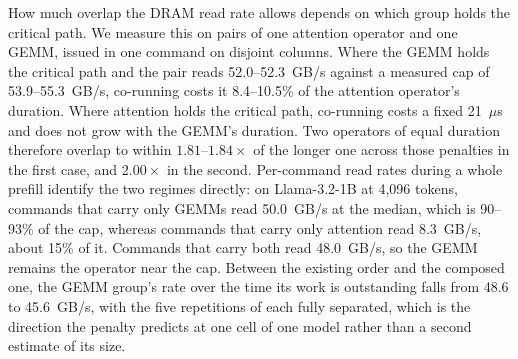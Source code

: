 How much overlap the DRAM read rate allows depends on which group holds the critical path.
We measure this on pairs of one attention operator and one GEMM, issued in one command on disjoint columns.
Where the GEMM holds the critical path and the pair reads 52.0--52.3~GB/s against a measured cap of 53.9--55.3~GB/s, co-running costs it 8.4--10.5\% of the attention operator's duration.
Where attention holds the critical path, co-running costs a fixed 21~$\mu$s and does not grow with the GEMM's duration.
Two operators of equal duration therefore overlap to within $1.81$--$1.84\times$ of the longer one across those penalties in the first case, and $2.00\times$ in the second.
Per-command read rates during a whole prefill identify the two regimes directly: on Llama-3.2-1B at 4{,}096 tokens, commands that carry only GEMMs read 50.0~GB/s at the median, which is 90--93\% of the cap, whereas commands that carry only attention read 8.3~GB/s, about 15\% of it.
Commands that carry both read 48.0~GB/s, so the GEMM remains the operator near the cap.
Between the existing order and the composed one, the GEMM group's rate over the time its work is outstanding falls from 48.6 to 45.6~GB/s, with the five repetitions of each fully separated, which is the direction the penalty predicts at one cell of one model rather than a second estimate of its size.

